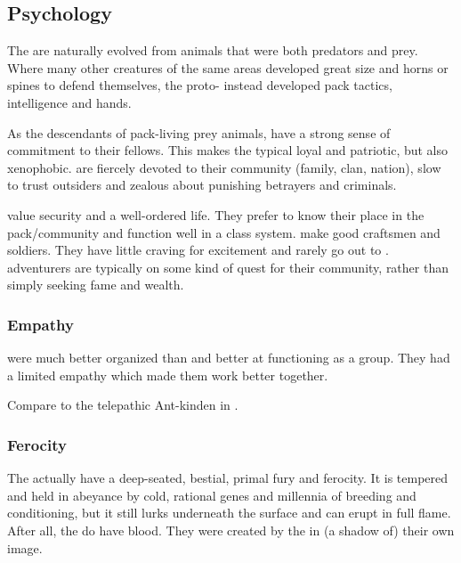 \subsection{Psychology}
The \scathae{} are naturally evolved from animals that were both predators and prey. Where many other creatures of the same areas developed great size and horns or spines to defend themselves, the proto-\scathae{} instead developed pack tactics, intelligence and hands. 

As the descendants of pack-living prey animals, \scathae{} have a strong sense of commitment to their fellows. This makes the typical \scatha{} loyal and patriotic, but also xenophobic. \Scathae{} are fiercely devoted to their community (family, clan, nation), slow to trust outsiders and zealous about punishing betrayers and criminals. 

\Scathae{} value security and a well-ordered life. They prefer to know their place in the pack/community and function well in a class system. \Scathae{} make good craftsmen and soldiers. They have little craving for excitement and rarely go out to . \Scathaese{} adventurers are typically on some kind of quest for their community, rather than simply seeking fame and wealth. 





\subsubsection{Empathy}
\Scathae were much better organized than \humans and better at functioning as a group. 
They had a limited empathy which made them work better together. 

Compare to the telepathic Ant-kinden in \cite{AdrianTchaikovsky:ShadowsoftheApt}. 





\subsubsection{Ferocity}
The \scathae{} actually have a deep-seated, bestial, primal fury and ferocity. 
It is tempered and held in abeyance by cold, rational \ophidian{} genes and millennia of breeding and conditioning, but it still lurks underneath the surface and can erupt in full flame. 
After all, the \scathae{} do have \xsic{} blood. 
They were created by the \dzraicchenosses{} in (a shadow of) their own image. 

